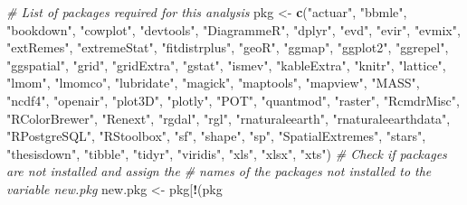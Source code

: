 \documentclass[12pt,twoside]{reedthesis}
\newenvironment{Shaded}{\begin{snugshade}}{\end{snugshade}}
\newcommand{\CommentTok}[1]{\textcolor[rgb]{0.56,0.35,0.01}{\textit{#1}}}
\newcommand{\KeywordTok}[1]{\textcolor[rgb]{0.13,0.29,0.53}{\textbf{#1}}}
\newcommand{\NormalTok}[1]{#1}
\newcommand{\OperatorTok}[1]{\textcolor[rgb]{0.81,0.36,0.00}{\textbf{#1}}}
\newcommand{\StringTok}[1]{\textcolor[rgb]{0.31,0.60,0.02}{#1}}
\begin{document}
\vspace{0.4cm}
\begin{Shaded}
\begin{Highlighting}[]
\CommentTok{# List of packages required for this analysis}
\NormalTok{  pkg <-}\StringTok{ }\KeywordTok{c}\NormalTok{(}\StringTok{"actuar"}\NormalTok{, }\StringTok{"bbmle"}\NormalTok{, }\StringTok{"bookdown"}\NormalTok{, }\StringTok{"cowplot"}\NormalTok{, }\StringTok{"devtools"}\NormalTok{, }\StringTok{"DiagrammeR"}\NormalTok{, }\StringTok{"dplyr"}\NormalTok{, }\StringTok{"evd"}\NormalTok{, }\StringTok{"evir"}\NormalTok{, }\StringTok{"evmix"}\NormalTok{, }\StringTok{"extRemes"}\NormalTok{, }\StringTok{"extremeStat"}\NormalTok{, }
  \StringTok{"fitdistrplus"}\NormalTok{, }\StringTok{"geoR"}\NormalTok{, }\StringTok{"ggmap"}\NormalTok{, }\StringTok{"ggplot2"}\NormalTok{, }\StringTok{"ggrepel"}\NormalTok{, }\StringTok{"ggspatial"}\NormalTok{, }\StringTok{"grid"}\NormalTok{, }\StringTok{"gridExtra"}\NormalTok{, }\StringTok{"gstat"}\NormalTok{, }\StringTok{"ismev"}\NormalTok{, }\StringTok{"kableExtra"}\NormalTok{, }\StringTok{"knitr"}\NormalTok{, }\StringTok{"lattice"}\NormalTok{, }
  \StringTok{"lmom"}\NormalTok{, }\StringTok{"lmomco"}\NormalTok{, }\StringTok{"lubridate"}\NormalTok{, }\StringTok{"magick"}\NormalTok{, }\StringTok{"maptools"}\NormalTok{, }\StringTok{"mapview"}\NormalTok{, }\StringTok{"MASS"}\NormalTok{, }\StringTok{"ncdf4"}\NormalTok{, }\StringTok{"openair"}\NormalTok{, }\StringTok{"plot3D"}\NormalTok{, }\StringTok{"plotly"}\NormalTok{, }\StringTok{"POT"}\NormalTok{, }\StringTok{"quantmod"}\NormalTok{, }\StringTok{"raster"}\NormalTok{, }
  \StringTok{"RcmdrMisc"}\NormalTok{, }\StringTok{"RColorBrewer"}\NormalTok{, }\StringTok{"Renext"}\NormalTok{, }\StringTok{"rgdal"}\NormalTok{, }\StringTok{"rgl"}\NormalTok{, }\StringTok{"rnaturaleearth"}\NormalTok{, }\StringTok{"rnaturaleearthdata"}\NormalTok{, }\StringTok{"RPostgreSQL"}\NormalTok{, }\StringTok{"RStoolbox"}\NormalTok{, }\StringTok{"sf"}\NormalTok{, }\StringTok{"shape"}\NormalTok{, }
  \StringTok{"sp"}\NormalTok{, }\StringTok{"SpatialExtremes"}\NormalTok{, }\StringTok{"stars"}\NormalTok{, }\StringTok{"thesisdown"}\NormalTok{, }\StringTok{"tibble"}\NormalTok{, }\StringTok{"tidyr"}\NormalTok{, }\StringTok{"viridis"}\NormalTok{, }\StringTok{"xls"}\NormalTok{, }\StringTok{"xlsx"}\NormalTok{, }\StringTok{"xts"}\NormalTok{)}
\CommentTok{# Check if packages are not installed and assign the}
\CommentTok{# names of the packages not installed to the variable new.pkg}
\NormalTok{  new.pkg <-}\StringTok{ }\NormalTok{pkg[}\OperatorTok{!}\NormalTok{(pkg }\OperatorTok{%
}
\end{Highlighting}
\end{Shaded}
\end{document}
